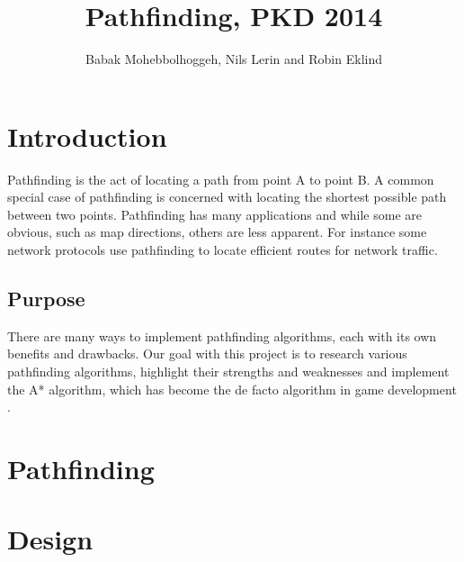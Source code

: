 \documentclass[12pt, a4paper]{article}
\title{Pathfinding, PKD 2014}
\author{Babak Mohebbolhoggeh, Nils Lerin and Robin Eklind}
\begin{document}
\maketitle

\pagebreak

\tableofcontents

\pagebreak


\section{Introduction}

Pathfinding is the act of locating a path from point A to point B. A common
special case of pathfinding is concerned with locating the shortest possible
path between two points. Pathfinding has many applications and while some are
obvious, such as map directions, others are less apparent. For instance some
network protocols use pathfinding to locate efficient routes for network
traffic.


\subsection{Purpose}

There are many ways to implement pathfinding algorithms, each with its own
benefits and drawbacks. Our goal with this project is to research various
pathfinding algorithms, highlight their strengths and weaknesses and implement
the A* algorithm, which has become the de facto algorithm in game development
\cite{astar1, defacto}.


\section{Pathfinding}


\section{Design}

\end{document}

